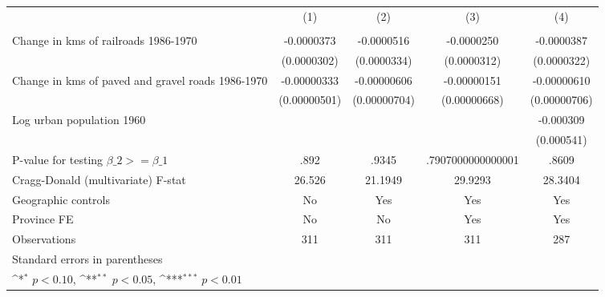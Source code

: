 {
\def\sym#1{\ifmmode^{#1}\else\(^{#1}\)\fi}
\begin{tabular}{l*{4}{c}}
\hline\hline
                &\multicolumn{1}{c}{(1)}&\multicolumn{1}{c}{(2)}&\multicolumn{1}{c}{(3)}&\multicolumn{1}{c}{(4)}\\
                &\multicolumn{1}{c}{}&\multicolumn{1}{c}{}&\multicolumn{1}{c}{}&\multicolumn{1}{c}{}\\
\hline
Change in kms of railroads 1986-1970&-0.0000373         &-0.0000516         &-0.0000250         &-0.0000387         \\
                &(0.0000302)         &(0.0000334)         &(0.0000312)         &(0.0000322)         \\
[1em]
Change in kms of paved and gravel roads 1986-1970&-0.00000333         &-0.00000606         &-0.00000151         &-0.00000610         \\
                &(0.00000501)         &(0.00000704)         &(0.00000668)         &(0.00000706)         \\
[1em]
Log urban population 1960&                  &                  &                  &-0.000309         \\
                &                  &                  &                  &(0.000541)         \\
\hline
P-value for testing $\beta\_{2} >= \beta\_{1}$&     .892         &    .9345         &.7907000000000001         &    .8609         \\
Cragg-Donald (multivariate) F-stat&   26.526         &  21.1949         &  29.9293         &  28.3404         \\
Geographic controls&       No         &      Yes         &      Yes         &      Yes         \\
Province FE     &       No         &       No         &      Yes         &      Yes         \\
Observations    &      311         &      311         &      311         &      287         \\
\hline\hline
\multicolumn{5}{l}{\footnotesize Standard errors in parentheses}\\
\multicolumn{5}{l}{\footnotesize \sym{*} \(p<0.10\), \sym{**} \(p<0.05\), \sym{***} \(p<0.01\)}\\
\end{tabular}
}
